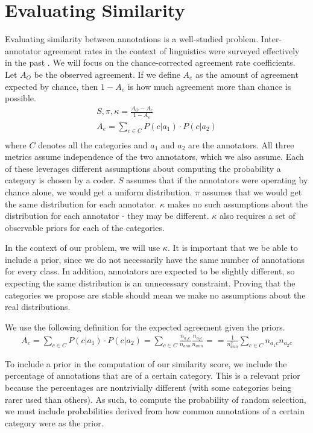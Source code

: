 \documentclass[letterpaper]{article}
\begin{document}
\section{Evaluating Similarity}
Evaluating similarity between annotations is a well-studied problem. Inter-annotator agreement rates in the context of linguistics were surveyed effectively in the past \cite{Artstein:2008:IAC:1479202.1479206}. We will focus on the chance-corrected agreement rate coefficients. Let $A_O$ be the observed agreement. If we define $A_e$ as the amount of agreement expected by chance, then $1-A_e$ is how much agreement more than chance is possible. 
\begin{eqnarray*}
S, \pi, \kappa = \frac{A_O - A_e}{1 - A_e} \\
A_e = \sum_{c \in C} P(c | a_1) \cdot P(c | a_2) \\
\end{eqnarray*}
where $C$ denotes all the categories and $a_1$ and $a_2$ are the annotators. All three metrics assume independence of the two annotators, which we also assume. Each of these leverages different assumptions about computing the probability a category is chosen by a coder. $S$ assumes that if the annotators were operating by chance alone, we would get a uniform distribution. $\pi$ assumes that we would get the same distribution for each annotator. $\kappa$ makes no such assumptions about the distribution for each annotator - they may be different. $\kappa$ also requires a set of observable priors for each of the categories. 

In the context of our problem, we will use $\kappa$. It is important that we be able to include a prior, since we do not necessarily have the same number of annotations for every class. In addition, annotators are expected to be slightly different, so expecting the same distribution is an unnecessary constraint. Proving that the categories we propose are stable should mean we make no assumptions about the real distributions.

We use the following definition for the expected agreement given the priors. 
\begin{eqnarray*}
A_e = \sum_{c \in C} P(c|a_1) \cdot P(c|a_2) = \sum_{c \in C} \frac{n_{a_1 c}}{n_{ann}} \frac{n_{a_2 c}}{n_{ann}} = = \frac{1}{n_{ann}^2} \sum_{c \in C} n_{a_1 c} n_{a_2 c}
\end{eqnarray*}

To include a prior in the computation of our similarity score, we include the percentage of annotations that are of a certain category. This is a relevant prior because the percentages are nontrivially different (with some categories being rarer used than others). As such, to compute the probability of random selection, we must include probabilities derived from how common annotations of a certain category were as the prior.
\end{document}
